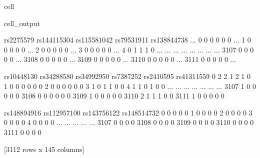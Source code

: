 \documentclass[letterpaper,10pt,english]{jupyterBook}
\begin{document}
\begin{sphinxuseclass}{cell}
\begin{sphinxVerbatimOutput}
\begin{sphinxuseclass}{cell_output}
\begin{sphinxVerbatim}[commandchars=\\\{\}]
      rs2275579  rs144115304  rs115581042  rs79531911  rs138844738  ...  \PYGZbs{}
0             0            0            0           0            0  ...   
1             0            0            0           0            0  ...   
2             0            0            0           0            0  ...   
3             0            0            0           0            0  ...   
4             0            1            1           1            0  ...   
...         ...          ...          ...         ...          ...  ...   
3107          0            0            0           0            0  ...   
3108          0            0            0           0            0  ...   
3109          0            0            0           0            0  ...   
3110          0            0            0           0            0  ...   
3111          0            0            0           0            0  ...   

      rs10448130  rs34288580  rs34992950  rs7387252  rs2410595  rs41311559  \PYGZbs{}
0              2           2           1          2          1           0   
1              0           0           0          0          0           0   
2              0           0           0          0          0           0   
3              1           0           1          1          0           0   
4              1           1           0          1          0           0   
...          ...         ...         ...        ...        ...         ...   
3107           1           0           0          0          0           0   
3108           0           0           0          0          0           0   
3109           1           0           0          0          0           0   
3110           2           1           1          1          0           0   
3111           1           0           0          0          0           0   

      rs148894916  rs112957100  rs143756122  rs148514732  
0               0            0            0            0  
1               0            0            0            0  
2               0            0            0            0  
3               0            0            0            0  
4               0            0            0            0  
...           ...          ...          ...          ...  
3107            0            0            0            0  
3108            0            0            0            0  
3109            0            0            0            0  
3110            0            0            0            0  
3111            0            0            0            0  

[3112 rows x 145 columns]
\end{sphinxVerbatim}

\end{sphinxuseclass}\end{sphinxVerbatimOutput}

\end{sphinxuseclass}
\end{document}
